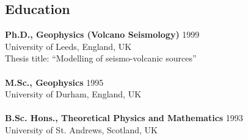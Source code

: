 \documentclass[margin,line]{res}
\begin{document}
\begin{resume}
\section{\sc Education}
{\bf Ph.D., Geophysics (Volcano Seismology)} \hfill 1999 \\
University of Leeds, England, UK\\
Thesis title:  ``Modelling of seismo-volcanic sources'' \\
\\
{\bf M.Sc., Geophysics} \hfill 1995\\
University of Durham, England, UK\\
\\
{\bf B.Sc. Hons., Theoretical Physics and Mathematics} \hfill 1993\\
University of St. Andrews, Scotland, UK
%
\begin{comment}
{\bf A Levels} \hfill 1989\\
Rawlins Academy, England, UK\\
Mathematics (A)
Physics (A)
Computer Science (B)
\end{comment}
%
\begin{comment}
{\bf O Levels} \hfill 1987\\
Rawlins Academy, England, UK\\
Mathematics (A)
Physics (A)
Computer Studies (A)
Chemistry (A)
Humanities (B)
English Literature (B)
English Language (C)
Technical Graphics (C)
\end{comment}
%

\end{resume}
\end{document}
